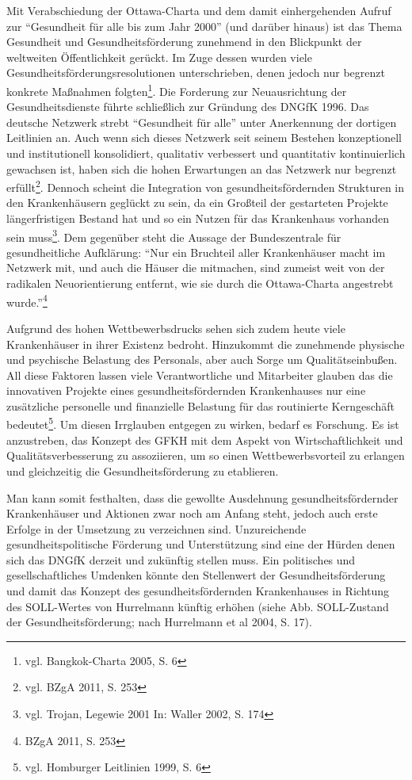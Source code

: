 Mit Verabschiedung der Ottawa-Charta und dem damit einhergehenden Aufruf zur "`Gesundheit für alle bis zum Jahr 2000"' (und darüber hinaus) ist das Thema Gesundheit und Gesundheitsförderung zunehmend in den Blickpunkt der weltweiten Öffentlichkeit gerückt. Im Zuge dessen wurden viele Gesundheitsförderungsresolutionen unterschrieben, denen jedoch nur begrenzt konkrete Maßnahmen folgten\footnote{vgl. Bangkok-Charta 2005, S. 6}. Die Forderung zur Neuausrichtung der Gesundheitsdienste führte schließlich zur Gründung des DNGfK 1996. Das deutsche Netzwerk strebt "`Gesundheit für alle"' unter Anerkennung der dortigen Leitlinien an. Auch wenn sich dieses Netzwerk seit seinem Bestehen konzeptionell und institutionell konsolidiert, qualitativ verbessert und quantitativ kontinuierlich gewachsen ist, haben sich die hohen Erwartungen an das Netzwerk nur begrenzt erfüllt\footnote{vgl. BZgA 2011, S. 253}. Dennoch scheint die Integration von gesundheitsfördernden Strukturen in den Krankenhäusern geglückt zu sein, da ein Großteil der gestarteten Projekte längerfristigen Bestand hat und so ein Nutzen für das Krankenhaus vorhanden sein muss\footnote{vgl. Trojan, Legewie 2001 In: Waller 2002, S. 174}. Dem gegenüber steht die Aussage der Bundeszentrale für gesundheitliche Aufklärung: "`Nur ein Bruchteil aller Krankenhäuser macht im Netzwerk mit, und auch die Häuser die mitmachen, sind zumeist weit von der radikalen Neuorientierung entfernt, wie sie durch die Ottawa-Charta angestrebt wurde."'\footnote{BZgA 2011, S. 253}

Aufgrund des hohen Wettbewerbsdrucks sehen sich zudem heute viele Krankenhäuser in ihrer Existenz bedroht. Hinzukommt die zunehmende physische und psychische Belastung des Personals, aber auch Sorge um Qualitätseinbußen. All diese Faktoren lassen viele Verantwortliche und Mitarbeiter glauben das die innovativen Projekte eines gesundheitsfördernden Krankenhauses nur eine zusätzliche personelle und finanzielle Belastung für das routinierte Kerngeschäft bedeutet\footnote{vgl. Homburger Leitlinien 1999, S. 6}. Um diesen Irrglauben entgegen zu wirken, bedarf es Forschung. Es ist anzustreben, das Konzept des GFKH mit dem Aspekt von Wirtschaftlichkeit und Qualitätsverbesserung zu assoziieren, um so einen Wettbewerbsvorteil zu erlangen und gleichzeitig die Gesundheitsförderung zu etablieren.

Man kann somit festhalten, dass die gewollte Ausdehnung gesundheitsfördernder Krankenhäuser und Aktionen zwar noch am Anfang steht, jedoch auch erste Erfolge in der Umsetzung zu verzeichnen sind. Unzureichende gesundheitspolitische Förderung und Unterstützung sind eine der Hürden denen sich das DNGfK derzeit und zukünftig stellen muss. Ein politisches und gesellschaftliches Umdenken könnte den Stellenwert der Gesundheitsförderung und damit das Konzept des gesundheitsfördernden Krankenhauses in Richtung des SOLL-Wertes von Hurrelmann künftig erhöhen (siehe Abb. SOLL-Zustand der Gesundheitsförderung; nach Hurrelmann et al 2004, S. 17).

